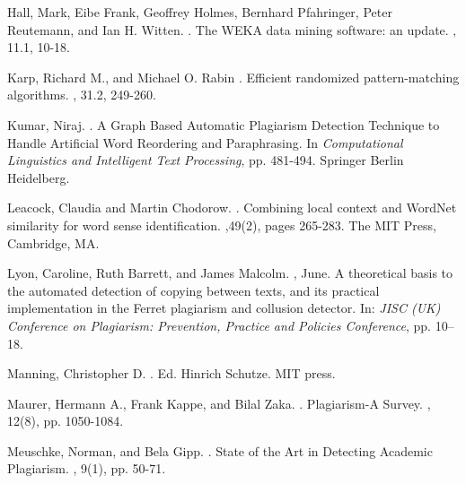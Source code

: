 \documentclass[11pt]{article}
\begin{document}
\begin{thebibliography}{}
Hall, Mark, Eibe Frank, Geoffrey Holmes, Bernhard Pfahringer, Peter Reutemann, and Ian H. Witten.
.
\newblock The WEKA data mining software: an update.
, 11.1, 10-18.

Karp, Richard M., and Michael O. Rabin
.
\newblock Efficient randomized pattern-matching algorithms.
, 31.2, 249-260.

Kumar, Niraj.
.
\newblock A Graph Based Automatic Plagiarism Detection Technique to Handle Artificial Word Reordering and Paraphrasing.
\newblock In {\em Computational Linguistics and Intelligent Text Processing}, pp. 481-494. Springer Berlin Heidelberg.

Leacock, Claudia and Martin Chodorow.
.
\newblock Combining local context and
WordNet similarity for word sense
identification.
,49(2), 
pages 265-283.
\newblock The MIT Press, Cambridge, MA.

Lyon, Caroline, Ruth Barrett, and James Malcolm.
, June.
\newblock A theoretical basis to the automated detection of copying between texts, and its practical implementation in the Ferret plagiarism and collusion detector.
\newblock In: {\em JISC (UK) Conference on Plagiarism: Prevention, Practice and
Policies Conference}, pp. 10--18. 

Manning, Christopher D.
.
 Ed. Hinrich Schutze. MIT press.

Maurer, Hermann A., Frank Kappe, and Bilal Zaka.
.
\newblock Plagiarism-A Survey. 
, 12(8), pp. 1050-1084.

Meuschke, Norman, and Bela Gipp.
.
\newblock State of the Art in Detecting Academic Plagiarism. 
, 9(1), pp. 50-71.


\end{thebibliography}
\end{document}
